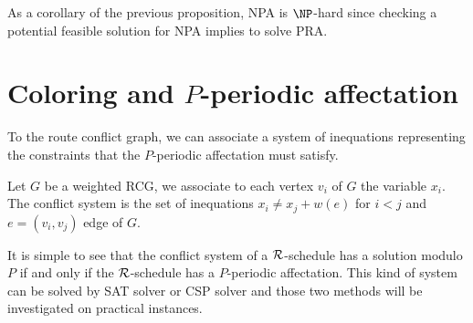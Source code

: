 \documentclass{article}
\newcommand\rschedule{$\cal R$-schedule\xspace}
\begin{document}
% 
% 
% 
% 
% 

As a corollary of the previous proposition, NPA is $\NP$-hard since checking a potential feasible solution for NPA implies to solve PRA.





\section{Coloring and $P$-periodic affectation}

To the route conflict graph, we can associate a system of inequations representing the constraints that the 
$P$-periodic affectation must satisfy.

\begin{definition}
 Let $G$ be a weighted RCG, we associate to each vertex $v_i$ of $G$ the variable $x_i$.
 The conflict system is the set of inequations $ x_i \neq x_j + w(e)$ for $i < j$ and $e=(v_i,v_j)$ edge of $G$.
\end{definition}

It is simple to see that the conflict system of a \rschedule has a solution modulo $P$ if and only if 
the \rschedule has a $P$-periodic affectation. This kind of system can be solved by SAT solver or CSP solver and those two methods will be investigated on practical instances.
\end{document}
